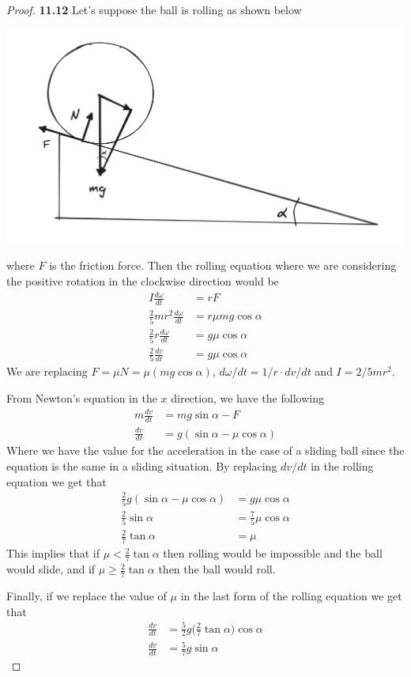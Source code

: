 \documentclass[11pt]{article}
\theoremstyle{definition}
\begin{document}
\cleardoublepage
\begin{proof}{\textbf{11.12}}
    Let's suppose the ball is rolling as shown below
    \begin{center}
        \includegraphics[scale=0.45]{ch11-12.png}
    \end{center}
    where $F$ is the friction force. Then the rolling equation where we are
    considering the positive rotation in the clockwise direction
    would be
    \begin{align*}
        I \frac{d\omega}{dt} &= rF\\
        \frac{2}{5}mr^2\frac{d\omega}{dt} &= r\mu mg\cos\alpha\\
        \frac{2}{5}r\frac{d\omega}{dt} &= g\mu \cos\alpha\\
        \frac{2}{5}\frac{dv}{dt} &= g\mu \cos\alpha
    \end{align*}
    We are replacing $F = \mu N = \mu (mg \cos\alpha)$,
    $d\omega/dt = 1/r\cdot dv/dt$ and $I = 2/5 mr^2$.

    From Newton's equation in the $x$ direction, we have the following
    \begin{align*}
        m \frac{dv}{dt} &= mg \sin\alpha - F\\
        \frac{dv}{dt} &= g(\sin\alpha - \mu \cos\alpha)
    \end{align*}
    Where we have the value for the acceleration in the case of a sliding ball
    since the equation is the same in a sliding situation.
    By replacing $dv/dt$ in the rolling equation we get that
    \begin{align*}
        \frac{2}{5}g(\sin\alpha - \mu \cos\alpha) &= g\mu \cos\alpha\\
        \frac{2}{5}\sin\alpha &= \frac{7}{5}\mu \cos\alpha\\   
        \frac{2}{7}\tan\alpha &= \mu   
    \end{align*}
    This implies that if $\mu < \frac{2}{7}\tan\alpha$ then rolling would be
    impossible and the ball would slide, and if $\mu \geq \frac{2}{7}\tan\alpha$
    then the ball would roll.

    Finally, if we replace the value of $\mu$ in the last form of the rolling
    equation we get that
    \begin{align*}        
        \frac{dv}{dt} &= \frac{5}{2}g\bigg(\frac{2}{7}\tan\alpha\bigg)\cos\alpha\\
        \frac{dv}{dt} &= \frac{5}{7}g\sin\alpha
    \end{align*}
\end{proof}
\end{document}
